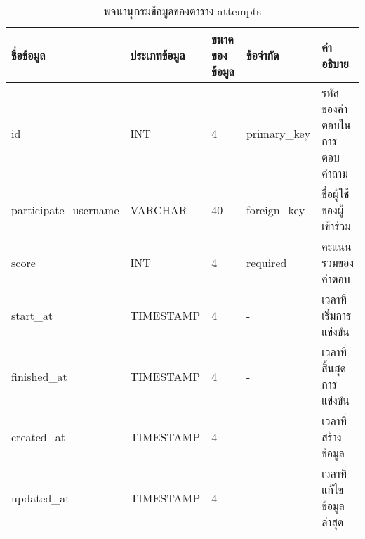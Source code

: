 \begin{table}[H]
    \caption{พจนานุกรมข้อมูลของตาราง attempts}
    \label{tab:database-attempts}
    \begin{tabularx}{\textwidth}{ | p{2.25cm} | p{2.20cm} | p{2.45cm} | p{2cm} | X | }
    \hline
    \textbf{ชื่อข้อมูล} & \textbf{ประเภทข้อมูล} & \textbf{ขนาดของข้อมูล} & \textbf{ข้อจำกัด} & \textbf{คำอธิบาย} \\
    \hline
    id & INT & 4 & primary\_key & รหัสของคำตอบในการตอบคำถาม \\
    \hline
    participate_username & VARCHAR & 40 & foreign\_key & ชื่อผู้ใช้ของผู้เข้าร่วม \\
    \hline
    score & INT & 4 & required & คะแนนรวมของคำตอบ \\
    \hline
    start\_at & TIMESTAMP & 4 & - & เวลาที่เริ่มการแข่งขัน \\
    \hline
    finished\_at & TIMESTAMP & 4 & - & เวลาที่สิ้นสุดการแข่งขัน \\
    \hline
    created\_at & TIMESTAMP & 4 & - & เวลาที่สร้างข้อมูล \\
    \hline
    updated\_at & TIMESTAMP & 4 & - & เวลาที่แก้ไขข้อมูลล่าสุด \\
    \hline
    \end{tabularx}
\end{table}